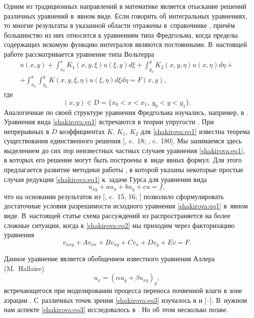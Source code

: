 Одним из традиционных направлений в математике является отыскание решений различных уравнений в~явном виде. 
Если говорить об интегральных уравнениях, то многие результаты в указанной области отражены в~справочнике \cite{shakirova:1-ru}, причём большинство из них относится к уравнениям типа Фредгольма, когда пределы содержащих искомую функцию интегралов являются постоянными. 
В~настоящей работе рассматривается уравнение типа Вольтерра
\begin{multline}
\label{shakirova:eq1}
u(x,y)+\int_{x_0}^x K_1(x,y,\xi)u(\xi,y)d\xi+\int_{y_0}^y K_2(x,y,\eta)u(x,\eta)d\eta+
\\
+\int_{x_0}^x \int_{y_0}^y K(x,y,\xi,\eta)u(\xi,\eta)d\xi d\eta=F(x,y),
\end{multline}
где 
$$(x, y)\in D=\{x_0<x<x_1, \ y_0<y<y_1\}.$$ 
Аналогичные по своей структуре уравнения Фредгольма изучались, например, в \cite{shakirova:2-ru}.  
Уравнения вида \eqref{shakirova:eq1} встречаются в теории упругости \cite[c.~279, формула $(62.12)$, описывает изгиб тонкой сферической оболочки]{shakirova:3-ru}. 
При непрерывных в $\overline{D}$ коэффициентах $K$, $K_1$, $K_2$ для \eqref{shakirova:eq1}  известна теорема существования единственного решения  [, c.~18;  , c.~180]. 
Мы занимаемся здесь выделением до сих пор неизвестных частных случаев уравнения \eqref{shakirova:eq1}, в которых его решение могут быть построены в~виде явных формул. 
Для этого предлагается развитие методики работы \cite{shakirova:5-ru}, в которой указаны некоторые простые случаи редукции \eqref{shakirova:eq1} к~задаче Гурса для уравнения вида 
\begin{equation}
\label{shakirova:eq2}
u_{xy}+au_x+bu_y+c u =f,
\end{equation}
что на основании результатов из [, c.~15, 16; ] позволило сформулировать достаточные условия разрешимости исходного уравнения \eqref{shakirova:eq1} в~явном виде. 
В~настоящей статье схема рассуждений из \cite{shakirova:5-ru} распространяется на более сложные ситуации, когда к \eqref{shakirova:eq2} мы приходим через факторизацию уравнения
\begin{equation}
\label{shakirova:eq3}
v_{xxy}+Av_{xx}+Bv_{xy}+Cv_x+Dv_y+Ev=F.
\end{equation}

Данное уравнение является обобщением известного уравнения Аллера (M.~Hallaire) 
$$
u_x=(\alpha u_y+\beta u_{xy})_y,
$$ 
встречающегося при моделировании процесса переноса почвенной влаги в зоне аэрации \cite{shakirova:add1-ru, shakirova:add2-ru}. 
С~различных точек зрения \eqref{shakirova:eq3}  изучалось в \cite{shakirova:6-ru} и [--]. 
В~нужном нам аспекте \eqref{shakirova:eq3} исследовалось в \cite[c.~136]{shakirova:6-ru}. 
Но об этом несколько позже.


